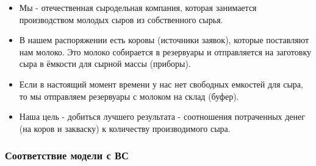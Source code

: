 \documentclass[a4paper, 14pt]{article}
\begin{document}
\begin{itemize}
	\item Мы - отечественная сыродельная компания, которая занимается производством молодых сыров из собственного сырья.
	\item В нашем распоряжении есть коровы (источники заявок), которые поставляют нам молоко. Это молоко собирается в резервуары и отправляется на заготовку сыра в ёмкости для сырной массы (приборы).
	\item Если в настоящий момент времени у нас нет свободных емкостей для сыра, то мы отправляем резервуары с молоком на склад (буфер).
	\item Наша цель - добиться лучшего результата - соотношения потраченных денег (на коров и закваску) к количеству производимого сыра.
\end{itemize}

\subsubsection{Соответствие модели с ВС}
\end{document}
